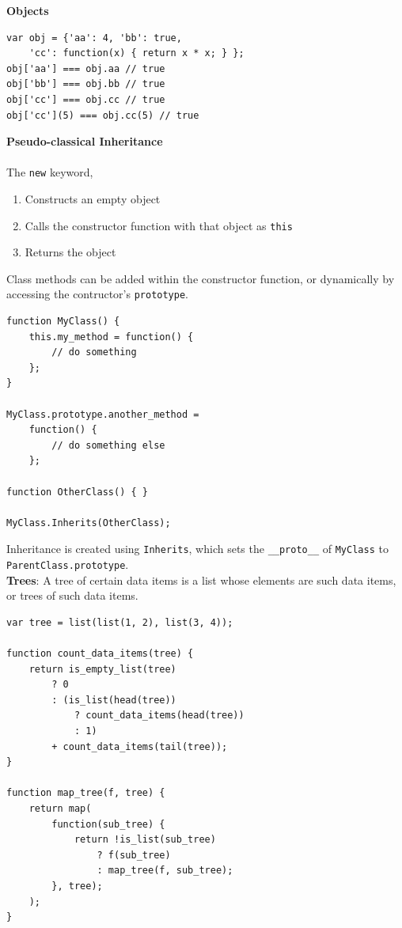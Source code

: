 \documentclass[a4paper]{article} \usepackage[backend=biber, style=numeric, sorting=none]{biblatex}
\begin{document}
\begin{multicols*}{4}
{\small\textbf{Objects}}
\begin{verbatim}
var obj = {'aa': 4, 'bb': true, 
    'cc': function(x) { return x * x; } };
obj['aa'] === obj.aa // true
obj['bb'] === obj.bb // true
obj['cc'] === obj.cc // true
obj['cc'](5) === obj.cc(5) // true
\end{verbatim}

{\small\textbf{Pseudo-classical Inheritance}}
\\ \\
The \texttt{new} keyword,
\begin{enumerate}
\itemsep -0.5em
\item Constructs an empty object
\item Calls the constructor function with that object as \texttt{this}
\item Returns the object
\end{enumerate}

Class methods can be added within the constructor function, or dynamically by accessing the contructor's \texttt{prototype}.

\begin{verbatim}
function MyClass() {
    this.my_method = function() {
        // do something
    };
}

MyClass.prototype.another_method =
    function() {
        // do something else
    };

function OtherClass() { }

MyClass.Inherits(OtherClass);
\end{verbatim}

Inheritance is created using \texttt{Inherits}, which sets the \texttt{\_\_proto\_\_} of \texttt{MyClass} to \texttt{ParentClass.prototype}. \\

{\small\textbf{Trees}}: A tree of certain data items is a list whose elements are such data items, or trees of such data items.

\begin{verbatim}
var tree = list(list(1, 2), list(3, 4));

function count_data_items(tree) {
    return is_empty_list(tree)
        ? 0
        : (is_list(head(tree))
            ? count_data_items(head(tree))
            : 1)
        + count_data_items(tail(tree));
}

function map_tree(f, tree) {
    return map(
        function(sub_tree) {
            return !is_list(sub_tree)
                ? f(sub_tree)
                : map_tree(f, sub_tree);
        }, tree);
    );
}
\end{verbatim}


\end{multicols*}
\end{document}
